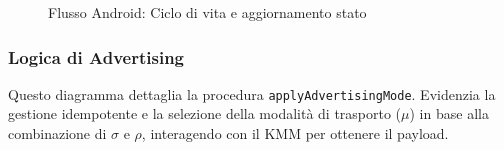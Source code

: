 \documentclass[a4paper,11pt,table,dvipsnames]{article}
\begin{document}
\begin{figure}[H]
    \caption{Flusso Android: Ciclo di vita e aggiornamento stato}
    \label{fig:android_lifecycle_flow}
\end{figure}

\newpage

\subsubsection{Logica di Advertising}
Questo diagramma dettaglia la procedura \texttt{applyAdvertisingMode}. Evidenzia la gestione idempotente e la selezione della modalità di trasporto (\(\mu\)) in base alla combinazione di \(\sigma\) e \(\rho\), interagendo con il KMM per ottenere il payload.
\end{document}
